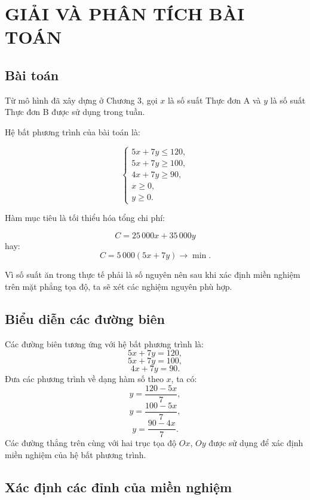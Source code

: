 \documentclass[12pt,a4paper]{article}
\begin{document}
\newpage

\section{GIẢI VÀ PHÂN TÍCH BÀI TOÁN}

\subsection{Bài toán}

Từ mô hình đã xây dựng ở Chương 3, gọi $x$ là số suất Thực đơn A và $y$ là số suất Thực đơn B được sử dụng trong tuần.

Hệ bất phương trình của bài toán là:

\[
\begin{cases}
5x+7y\leq120,\\
5x+7y\geq100,\\
4x+7y\geq90,\\
x\geq0,\\
y\geq0.
\end{cases}
\]

Hàm mục tiêu là tối thiểu hóa tổng chi phí:

\[
\boxed{
C=25\,000x+35\,000y
}
\]
hay:
\[
\boxed{
C=5\,000(5x+7y)\longrightarrow\min.
}
\]

Vì số suất ăn trong thực tế phải là số nguyên nên sau khi xác định miền nghiệm trên mặt phẳng tọa độ, ta sẽ xét các nghiệm nguyên phù hợp.


\subsection{Biểu diễn các đường biên}

Các đường biên tương ứng với hệ bất phương trình là:
\[
5x+7y=120,
\]
\[
5x+7y=100,
\]
\[
4x+7y=90.
\]
Đưa các phương trình về dạng hàm số theo $x$, ta có:
\[
y=\frac{120-5x}{7},
\]
\[
y=\frac{100-5x}{7},
\]
\[
y=\frac{90-4x}{7}.
\]
Các đường thẳng trên cùng với hai trục tọa độ $Ox$, $Oy$ được sử dụng để xác định miền nghiệm của hệ bất phương trình.


\subsection{Xác định các đỉnh của miền nghiệm}
\end{document}
